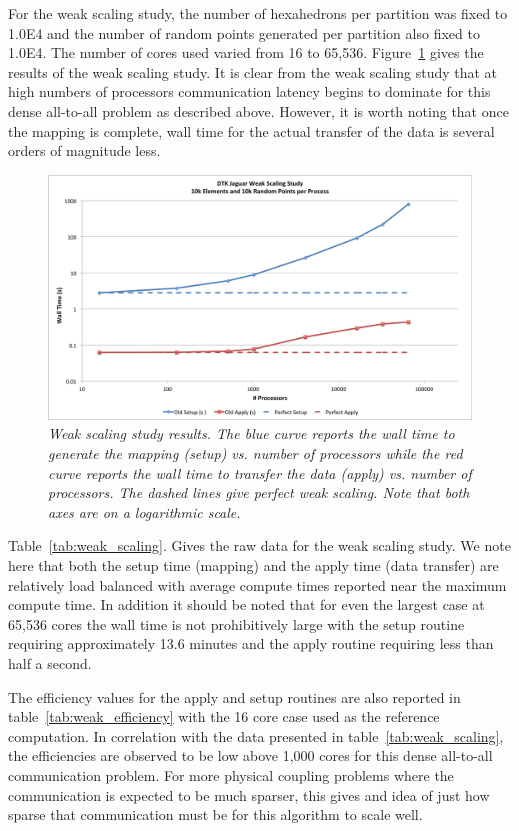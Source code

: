 \documentclass{mc2013}
\begin{document}
\label{subsec:weak_scaling}
For the weak scaling study, the number of hexahedrons per partition
was fixed to 1.0E4 and the number of random points generated per
partition also fixed to 1.0E4. The number of cores used varied from 16
to 65,536. Figure~\ref{fig:weak_scaling} gives the results of the weak
scaling study. It is clear from the weak scaling study that at high
numbers of processors communication latency begins to dominate for
this dense all-to-all problem as described above. However, it is worth
noting that once the mapping is complete, wall time for the actual
transfer of the data is several orders of magnitude less.

\begin{figure}[htpb!]
  \centering
  \includegraphics[width=5.5in]{WeakScaling.png}
  \caption{\sl Weak scaling study results. The blue curve reports the
    wall time to generate the mapping (setup) vs. number of processors
    while the red curve reports the wall time to transfer the data
    (apply) vs. number of processors. The dashed lines give perfect
    weak scaling. Note that both axes are on a logarithmic scale. }
  \label{fig:weak_scaling}
\end{figure}

Table~\ref{tab:weak_scaling}. Gives the raw data for the weak scaling
study. We note here that both the setup time (mapping) and the apply
time (data transfer) are relatively load balanced with average compute
times reported near the maximum compute time. In addition it should be
noted that for even the largest case at 65,536 cores the wall time is
not prohibitively large with the setup routine requiring approximately
13.6 minutes and the apply routine requiring less than half a second.

The efficiency values for the apply and setup routines are also
reported in table~\ref{tab:weak_efficiency} with the 16 core case used
as the reference computation. In correlation with the data presented
in table~\ref{tab:weak_scaling}, the efficiencies are observed to be
low above 1,000 cores for this dense all-to-all communication
problem. For more physical coupling problems where the communication
is expected to be much sparser, this gives and idea of just how sparse
that communication must be for this algorithm to scale well.
\end{document}
